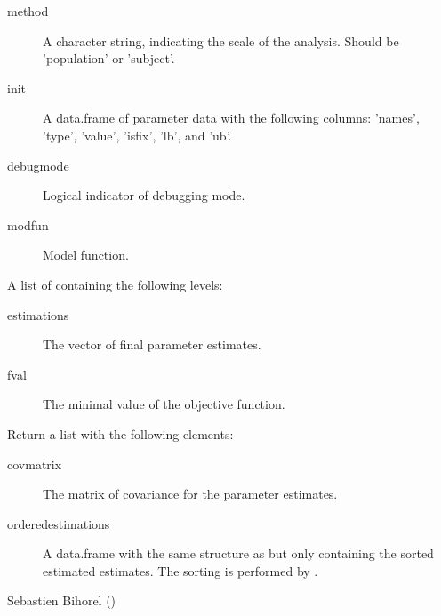 \begin{Arguments}
\begin{ldescription}
\begin{description}
\item[method] A character string, indicating the scale of the analysis. Should
be 'population' or 'subject'.
\item[init] A data.frame of parameter data with the following columns:
'names', 'type', 'value', 'isfix', 'lb', and 'ub'.
\item[debugmode] Logical indicator of debugging mode.
\item[modfun] Model function.

\end{description}


\item[\code{Fit}] A list of containing the following levels:\begin{description}

\item[estimations] The vector of final parameter estimates.
\item[fval] The minimal value of the objective function.

\end{description}


\end{ldescription}
\end{Arguments}
%
\begin{Value}
Return a list with the following elements: \begin{description}

\item[covmatrix] The matrix of covariance for the parameter estimates.
\item[orderedestimations] A data.frame with the same structure as
 but only containing the sorted estimated estimates.
The sorting is performed by .

\end{description}

\end{Value}
%
\begin{Author}\relax
Sebastien Bihorel ()
\end{Author}
%
\begin{SeeAlso}\relax
{}
\end{SeeAlso}
